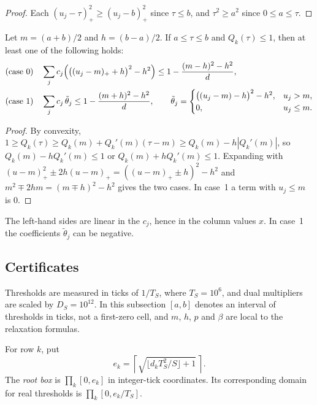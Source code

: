 \begin{proof}
Each $(u_j-\tau)_+^2\ge(u_j-b)_+^2$ since $\tau\le b$, and $\tau^2\ge a^2$ since $0\le a\le\tau$.
\end{proof}

\begin{lemma}\label{lem:tangent}
Let $m=(a+b)/2$ and $h=(b-a)/2$. If $a\le\tau\le b$ and $Q_k(\tau)\le1$, then at least one of
the following holds:
\begin{align*}
  \text{(case 0)}\quad&\sum_jc_j\Bigl(\bigl((u_j-m)_++h\bigr)^2-h^2\Bigr)\le
    1-\frac{(m-h)^2-h^2}{d},\\
  \text{(case 1)}\quad&\sum_jc_j\,\tilde\theta_j\le1-\frac{(m+h)^2-h^2}{d},\qquad
    \tilde\theta_j=\begin{cases}\bigl((u_j-m)-h\bigr)^2-h^2,&u_j>m,\\0,&u_j\le m.\end{cases}
\end{align*}
\end{lemma}

\begin{proof}
By convexity, $1\ge Q_k(\tau)\ge Q_k(m)+Q_k'(m)(\tau-m)\ge Q_k(m)-h|Q_k'(m)|$, so
$Q_k(m)-hQ_k'(m)\le1$ or $Q_k(m)+hQ_k'(m)\le1$. Expanding with
$(u-m)_+^2\pm2h(u-m)_+=((u-m)_+\pm h)^2-h^2$ and $m^2\mp2hm=(m\mp h)^2-h^2$ gives the two cases.
In case~1 a term with $u_j\le m$ is $0$.
\end{proof}

The left-hand sides are linear in the $c_j$, hence in the column values $x$. In case~1 the
coefficients $\tilde\theta_j$ can be negative.

\subsection{Certificates}
Thresholds are measured in ticks of $1/T_S$, where $T_S=10^6$, and dual multipliers are scaled
by $D_S=10^{12}$. In this subsection $[a,b]$ denotes an interval of thresholds in ticks, not a
first-zero cell, and $m$, $h$, $p$ and $\beta$ are local to the relaxation formulas.

\begin{definition}\label{def:rootbox}
For row $k$, put
\[
  e_k=\left\lceil\sqrt{\lfloor d_kT_S^2/S\rfloor+1}\,\right\rceil.
\]
The \emph{root box} is $\prod_k[0,e_k]$ in integer-tick coordinates. Its corresponding
domain for real thresholds is $\prod_k[0,e_k/T_S]$.
\end{definition}

